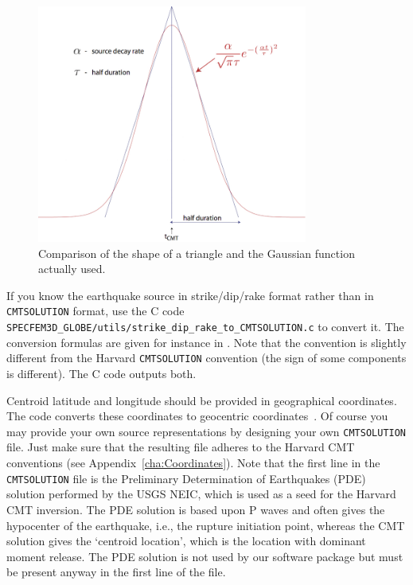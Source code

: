 %
\begin{figure}[htp]
\begin{centering}
\includegraphics[width=3.5in]{figures/gauss_vs_triangle_mod.jpg}
\par
\end{centering}
\caption{Comparison of the shape of a triangle and the Gaussian function actually used.}
\label{fig:gauss.vs.triangle}
\end{figure}


If you know the earthquake source in strike/dip/rake format rather
than in \texttt{CMTSOLUTION} format, use the C code \texttt{SPECFEM3D\_GLOBE/utils/strike\_dip\_rake\_to\_CMTSOLUTION.c}
to convert it. The conversion formulas are given for instance in \citet{AkRi80}.
Note that the \citet{AkRi80} convention is slightly different from
the Harvard \texttt{CMTSOLUTION} convention (the sign of some components
is different). The C code outputs both.

Centroid latitude and longitude should be provided in geographical
coordinates. The code converts these coordinates to geocentric coordinates~\citep{DaTr98}.
Of course you may provide your own source representations by designing
your own \texttt{CMTSOLUTION} file. Just make sure that the resulting
file adheres to the Harvard CMT conventions (see Appendix~\ref{cha:Coordinates}).
Note that the first line in the \texttt{CMTSOLUTION} file is the Preliminary
Determination of Earthquakes (PDE) solution performed by the USGS
NEIC, which is used as a seed for the Harvard CMT inversion. The PDE
solution is based upon P waves and often gives the hypocenter of the
earthquake, i.e., the rupture initiation point, whereas the CMT solution
gives the `centroid location', which is the location with dominant
moment release. The PDE solution is not used by our software package
but must be present anyway in the first line of the file.

